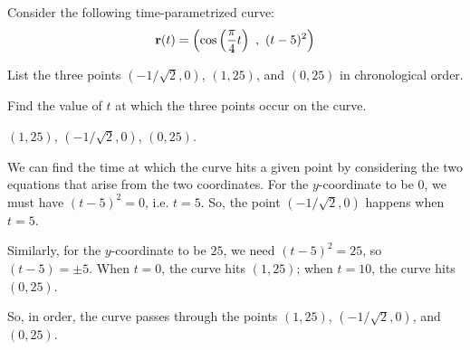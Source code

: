 



\subsection*{\Conceptual}

\begin{question}\label{prob_s1.0first}
Consider the following time-parametrized curve:
\[\mathbf{r}(t)=\left( \cos\left(\frac{\pi}{4}t\right)~,~(t-5)^2\right)\]

List the three points $(-1/\sqrt{2},0)$, $(1,25)$, and $(0,25)$ in chronological order.
\end{question}
\begin{hint}
Find the value of $t$ at which the three points occur on the curve.
\end{hint}
\begin{answer}
$(1,25)$, $(-1/\sqrt2,0)$, $(0,25)$.
\end{answer}
\begin{solution}
We can find the time at which the curve hits a given point by considering the two equations that arise from the two coordinates. For the $y$-coordinate to be 0, we must have $(t-5)^2=0$, i.e. $t=5$. So, the point $(-1/\sqrt{2},0)$ happens when $t=5$.

Similarly, for the $y$-coordinate to be $25$,  we need $(t-5)^2=25$, so $(t-5)=\pm 5$.
When $t=0$, the curve hits $(1, 25)$; when $t=10$, the curve hits $(0,25)$.

So, in order, the curve passes through the points $(1,25)$, $(-1/\sqrt2,0)$, and $(0,25)$.
\end{solution}

